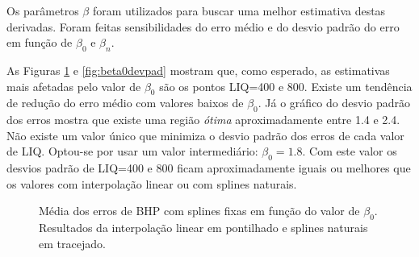 \documentclass[final,5p]{elsarticle}
\numberwithin{equation}{section}
\begin{document}
        Os parâmetros $\beta$ foram utilizados para buscar uma melhor estimativa destas derivadas. Foram feitas sensibilidades do erro médio e do desvio padrão do erro em função de $\beta_0$ e $\beta_n$.
        
        As Figuras \ref{fig:beta0media} e \ref{fig:beta0devpad} mostram que, como esperado, as estimativas mais afetadas pelo valor de $\beta_0$ são os pontos LIQ=400 e 800. Existe um tendência de redução do erro médio com valores baixos de $\beta_0$. Já o gráfico do desvio padrão dos erros mostra que existe uma região \emph{ótima} aproximadamente entre 1.4 e 2.4. Não existe um valor único que minimiza o desvio padrão dos erros de cada valor de LIQ. Optou-se por usar um valor intermediário: $\beta_0=1.8$. Com este valor os desvios padrão de LIQ=400 e 800 ficam aproximadamente iguais ou melhores que os valores com interpolação linear ou com splines naturais.

        \begin{figure}[hbt!] 
            \caption{Média dos erros de BHP com splines fixas em função do valor de $\beta_0$. Resultados da interpolação linear em pontilhado e splines naturais em tracejado.}
            \label{fig:beta0media}
        \end{figure}
\end{document}
